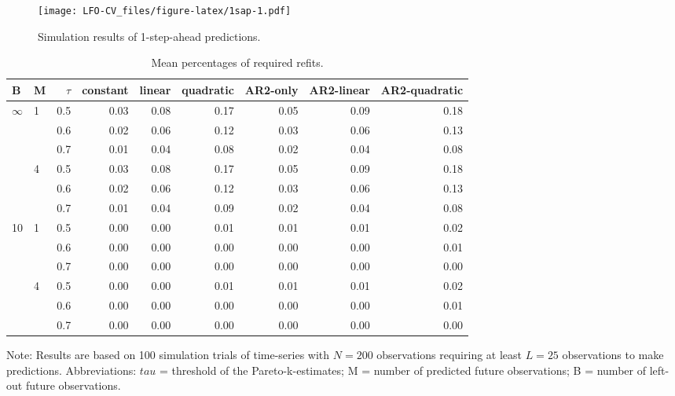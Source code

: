 \documentclass[american,]{article}
\begin{document}
\begin{figure}
\centering
\texttt{[image: LFO-CV\_files/figure-latex/1sap-1.pdf]}
\caption{\label{fig:1sap}Simulation results of 1-step-ahead predictions.}
\end{figure}

\begin{table}[t]

\caption{\label{tab:refits}Mean percentages of required refits.}
\centering
\begin{threeparttable}
\begin{tabular}{llrrrrrrr}
\toprule
B & M & $\tau$ & constant & linear & quadratic & AR2-only & AR2-linear & AR2-quadratic\\
\midrule
$\infty$ & 1 & 0.5 & 0.03 & 0.08 & 0.17 & 0.05 & 0.09 & 0.18\\
 &  & 0.6 & 0.02 & 0.06 & 0.12 & 0.03 & 0.06 & 0.13\\
 &  & 0.7 & 0.01 & 0.04 & 0.08 & 0.02 & 0.04 & 0.08\\
 & 4 & 0.5 & 0.03 & 0.08 & 0.17 & 0.05 & 0.09 & 0.18\\
 &  & 0.6 & 0.02 & 0.06 & 0.12 & 0.03 & 0.06 & 0.13\\
\addlinespace
 &  & 0.7 & 0.01 & 0.04 & 0.09 & 0.02 & 0.04 & 0.08\\
10 & 1 & 0.5 & 0.00 & 0.00 & 0.01 & 0.01 & 0.01 & 0.02\\
 &  & 0.6 & 0.00 & 0.00 & 0.00 & 0.00 & 0.00 & 0.01\\
 &  & 0.7 & 0.00 & 0.00 & 0.00 & 0.00 & 0.00 & 0.00\\
 & 4 & 0.5 & 0.00 & 0.00 & 0.01 & 0.01 & 0.01 & 0.02\\
\addlinespace
 &  & 0.6 & 0.00 & 0.00 & 0.00 & 0.00 & 0.00 & 0.01\\
 &  & 0.7 & 0.00 & 0.00 & 0.00 & 0.00 & 0.00 & 0.00\\
\bottomrule
\end{tabular}
\begin{tablenotes}
\item Note: Results are based on 100 simulation trials of time-series with $N = 200$ observations requiring at least $L = 25$ observations to make predictions. Abbreviations: $tau$ = threshold of the Pareto-k-estimates; M = number of predicted future observations; B = number of left-out future observations.
\end{tablenotes}
\end{threeparttable}
\end{table}
\end{document}
